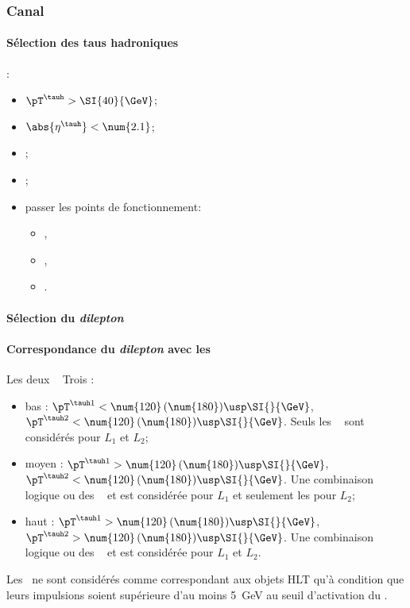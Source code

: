 \subsubsection{Canal \tauh\tauh}\label{chapter-HTT_analysis-section-offline-tt}
\paragraph{Sélection des taus hadroniques}
:
\begin{itemize}
    \item $\pT^{\tauh} > \SI{40}{\GeV}$;
    \item $\abs{\eta^{\tauh}} < \num{2.1}$;
    \item \TauHdz;
    \item \NewDecayModeFinding[footnote];
    \item passer les points de fonctionnement:
        \begin{itemize}
            \item {},
            \item {},
            \item {}.
        \end{itemize}
\end{itemize}
\paragraph{Sélection du \emph{dilepton}}
\AtLeastOneOSPair{\tauh\tauh}
\IfMoreOnePair
\paragraph{Correspondance du \emph{dilepton} avec les \HLTpaths}
Les deux \tauh\ \FromPairMatchToHLTObjects{}
Trois \HLTregionsDefined:
\begin{itemize}
    \item bas \pT: $\pT^{\tauh 1} < \num{120} \, (\num{180}) \usp \SI{}{\GeV}$, $\pT^{\tauh 2} < \num{120} \, (\num{180}) \usp \SI{}{\GeV}$.
        Seuls les \HLTpaths\ \HLTDoubleTau{} sont considérés pour $L_1$ et $L_2$;
    \item moyen \pT: $\pT^{\tauh 1} > \num{120} \, (\num{180}) \usp \SI{}{\GeV}$, $\pT^{\tauh 2} < \num{120} \, (\num{180}) \usp \SI{}{\GeV}$.
        Une combinaison logique \og ou \fg{} des \HLTpaths\ \HLTSingleTau{} et \HLTDoubleTau{} est considérée pour $L_1$ et seulement les \HLTDoubleTau{} pour $L_2$;
    \item haut \pT: $\pT^{\tauh 1} > \num{120} \, (\num{180}) \usp \SI{}{\GeV}$, $\pT^{\tauh 2} > \num{120} \, (\num{180}) \usp \SI{}{\GeV}$.
        Une combinaison logique \og ou \fg{} des \HLTpaths\ \HLTSingleTau{} et \HLTDoubleTau{} est considérée pour $L_1$ et $L_2$.
\end{itemize}
Les \tauh\ ne sont considérés comme correspondant aux objets HLT qu'à condition que leurs impulsions soient supérieure d'au moins \SI{5}{\GeV} au seuil d'activation du \HLTpath.
